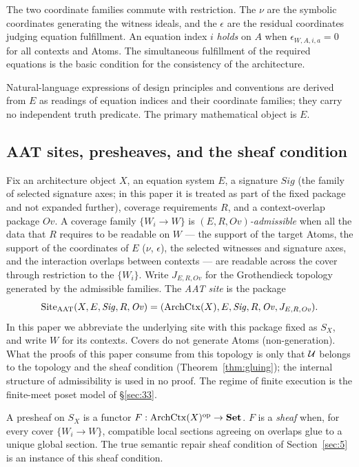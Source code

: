 The two coordinate families commute with restriction. The $\nu$ are the
symbolic coordinates generating the witness ideals, and the $\epsilon$
are the residual coordinates judging equation fulfillment. An equation
index $i$ \emph{holds} on $A$ when $\epsilon_{W,A,i,a}=0$ for all
contexts and Atoms. The simultaneous fulfillment of the required
equations is the basic condition for the consistency of the architecture.

Natural-language expressions of design principles and conventions are
derived from $E$ as readings of equation indices and their coordinate
families; they carry no independent truth predicate. The primary
mathematical object is $E$.

\subsection{AAT sites, presheaves, and the sheaf condition}\label{sec:35}

\begin{definition}\label{def:aatsite}
Fix an architecture object $X$, an equation system $E$, a signature
$\mathit{Sig}$ (the family of selected signature axes; in this paper it
is treated as part of the fixed package and not expanded further),
coverage requirements $R$, and a context-overlap package $\mathit{Ov}$.
A coverage family $\{W_i\to W\}$ is \emph{$(E,R,\mathit{Ov})$-admissible}
when all the data that $R$ requires to be readable on $W$ --- the support
of the target Atoms, the support of the coordinates of $E$ ($\nu$,
$\epsilon$), the selected witnesses and signature axes, and the
interaction overlaps between contexts --- are readable across the cover
through restriction to the $\{W_i\}$. Write $J_{E,R,\mathit{Ov}}$ for the
Grothendieck topology generated by the admissible families. The
\emph{AAT site} is the package
\[
\mathrm{Site}_{\mathrm{AAT}}(X,E,\mathit{Sig},R,\mathit{Ov})
=(\mathrm{ArchCtx}(X), E, \mathit{Sig}, R, \mathit{Ov}, J_{E,R,\mathit{Ov}}).
\]
In this paper we abbreviate the underlying site with this package fixed
as $S_X$, and write $W$ for its contexts. Covers do not generate Atoms
(non-generation). What the proofs of this paper consume from this
topology is only that $\mathcal{U}$ belongs to the topology and the sheaf
condition (Theorem~\ref{thm:gluing}); the internal structure of
admissibility is used in no proof. The regime of finite execution is the
finite-meet poset model of \S\ref{sec:33}.
\end{definition}

\begin{definition}\label{def:presheaf}\sloppy
A presheaf on $S_X$ is a functor $F:\mathrm{ArchCtx}(X)^{\mathrm{op}}\to
\mathbf{Set}$. $F$ is a \emph{sheaf} when, for every cover
$\{W_i\to W\}$, compatible local sections agreeing on overlaps glue to a
unique global section. The true semantic repair sheaf condition of
Section~\ref{sec:5} is an instance of this sheaf condition.
\end{definition}

